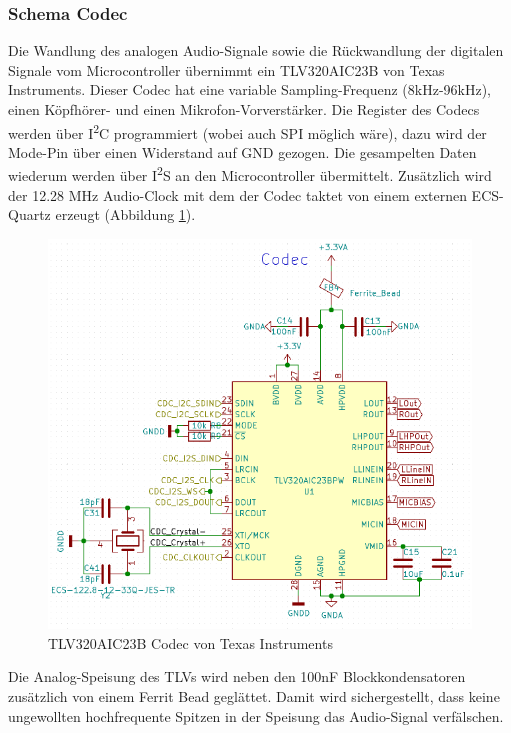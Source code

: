 \subsubsection{Schema Codec}
\label{sec:Schema_Codec}

Die Wandlung des analogen Audio-Signale sowie die Rückwandlung der digitalen Signale vom Microcontroller  übernimmt ein TLV320AIC23B von Texas Instruments. Dieser Codec hat eine variable Sampling-Frequenz (8kHz-96kHz), einen Köpfhörer- und einen Mikrofon-Vorverstärker. Die Register des Codecs werden über I\textsuperscript{2}C programmiert (wobei auch SPI möglich wäre), dazu wird der Mode-Pin über einen Widerstand auf GND gezogen. Die gesampelten Daten wiederum werden über I\textsuperscript{2}S an den Microcontroller übermittelt. Zusätzlich wird der 12.28 \si{MHz} Audio-Clock mit dem der Codec taktet von einem externen ECS-Quartz erzeugt (Abbildung \ref{fig:Schema_Codec}). 

\begin{figure} [H]
\begin{center}
\includegraphics[scale=0.5]{../graphics/Schema_Codec.png}
\caption{TLV320AIC23B Codec von Texas Instruments}
\label{fig:Schema_Codec}
\end{center}
\end{figure}

Die Analog-Speisung des TLVs wird neben den 100\si{nF} Blockkondensatoren zusätzlich von einem Ferrit Bead geglättet. Damit wird sichergestellt, dass keine ungewollten hochfrequente Spitzen in der Speisung das Audio-Signal verfälschen.

